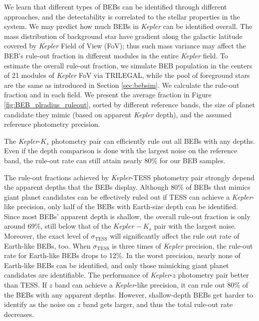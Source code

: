 \documentclass{aastex63}
\begin{document}
    We learn that different types of BEBs can be identified through different approaches, and the detectability is correlated to the stellar properties in the system. We may predict how much BEBs in \emph{Kepler} can be identified overall. The mass distribution of background star have gradient along the galactic latitude covered by \emph{Kepler} Field of View (FoV); thus such mass variance may affect the BEB's rule-out fraction in different modules in the entire \emph{Kepler} field. To estimate the overall rule-out fraction, we simulate BEB population in the centers of 21 modules of \emph{Kepler} FoV via TRILEGAL, while the pool of foreground stars are the same as introduced in Section \ref{sec:bebsim}. We calculate the rule-out fraction and in each field. We present the average fraction in Figure \ref{fig:BEB_plradius_ruleout}, sorted by different reference bands, the size of planet candidate they mimic (based on apparent \emph{Kepler} depth), and the assumed reference photometry precision. 
    
    The \emph{Kepler}-$K_s$ photometry pair can efficiently rule out all BEBs with any depths. Even if the depth comparison is done with the largest noise on the reference band, the rule-out rate can still attain nearly 80\% for our BEB samples. 

    The rule-out fractions achieved by \emph{Kepler}-TESS photometry pair strongly depend the apparent depths that the BEBs display. Although 80\% of BEBs that mimics giant planet candidates can be effectively ruled out if TESS can achieve a \emph{Kepler}-like precision, only half of the BEBs with Earth-size depth can be identified. Since most BEBs' apparent depth is shallow, the overall rule-out fraction is only around 69\%, still below that of the $Kepler-K_s$ pair with the largest noise. Moreover, the exact level of $\sigma_\mathrm{TESS}$ will significantly affect the rule out rate of Earth-like BEBs, too. When $\sigma_\mathrm{TESS}$ is three times of \emph{Kepler} precision, the rule-out rate for Earth-like BEBs drops to 12\%. In the worst precision, nearly none of Earth-like BEBs can be identified, and only those mimicking giant planet candidates are identifiable. The performance of \emph{Kepler}-$z$ photometry pair better than TESS. If $z$ band can achieve a \emph{Kepler}-like precision, it can rule out 80\% of the BEBs with any apparent depths. However, shallow-depth BEBs get harder to identify as the noise on $z$ band gets larger, and thus the total rule-out rate decreases.
\end{document}
